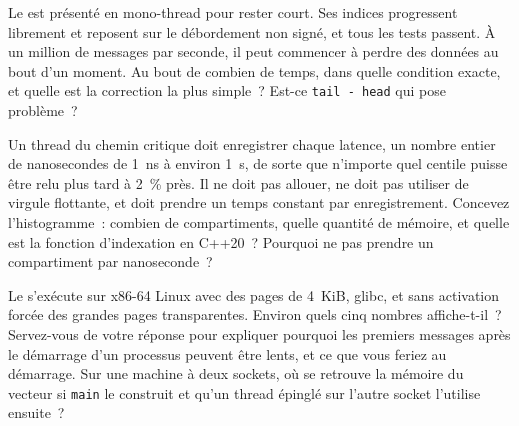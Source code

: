 \begin{question}\label{iq:iv3:low-latency:23}
Le  est présenté en mono-thread pour rester court. Ses indices progressent librement et reposent sur le débordement non signé, et tous les tests passent. À un million de messages par seconde, il peut commencer à perdre des données au bout d'un moment. Au bout de combien de temps, dans quelle condition exacte, et quelle est la correction la plus simple~? Est-ce \texttt{tail - head} qui pose problème~?
\label{lst:iv3:ll:wrap}
\end{question}

\begin{question}\label{iq:iv3:low-latency:24}
Un thread du chemin critique doit enregistrer chaque latence, un nombre entier de nanosecondes de 1~ns à environ 1~s, de sorte que n'importe quel centile puisse être relu plus tard à 2~\% près. Il ne doit pas allouer, ne doit pas utiliser de virgule flottante, et doit prendre un temps constant par enregistrement. Concevez l'histogramme~: combien de compartiments, quelle quantité de mémoire, et quelle est la fonction d'indexation en C++20~? Pourquoi ne pas prendre un compartiment par nanoseconde~?
\end{question}

\begin{question}\label{iq:iv3:low-latency:25}
Le  s'exécute sur x86-64 Linux avec des pages de 4~KiB, glibc, et sans activation forcée des grandes pages transparentes. Environ quels cinq nombres affiche-t-il~? Servez-vous de votre réponse pour expliquer pourquoi les premiers messages après le démarrage d'un processus peuvent être lents, et ce que vous feriez au démarrage. Sur une machine à deux sockets, où se retrouve la mémoire du vecteur si \texttt{main} le construit et qu'un thread épinglé sur l'autre socket l'utilise ensuite~?
\label{lst:iv3:ll:firsttouch}
\end{question}

